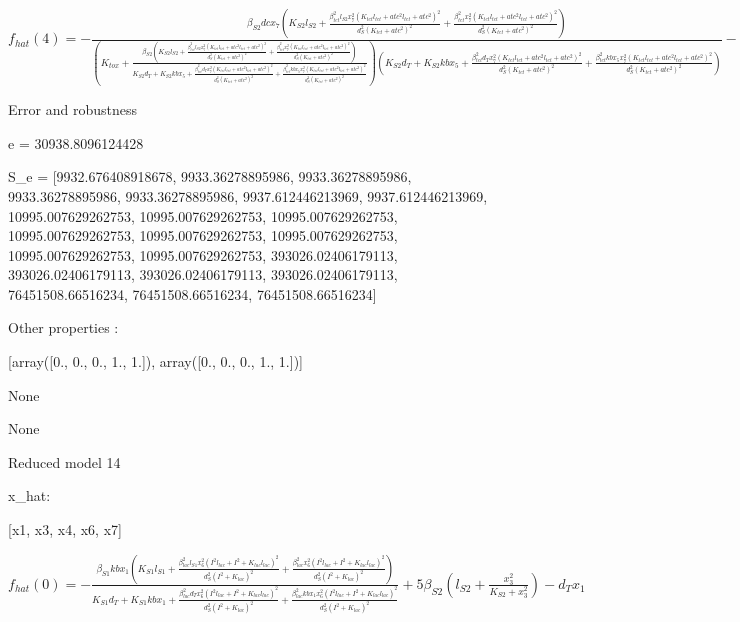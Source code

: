 $f_{hat}(4)=- \frac{\beta_{S2} dc x_{7} \left(K_{S2} l_{S2} + \frac{\beta_{tet}^{2} l_{S2} x_{7}^{2} \left(K_{tet} l_{tet} + atc^{2} l_{tet} + atc^{2}\right)^{2}}{d_{S}^{2} \left(K_{tet} + atc^{2}\right)^{2}} + \frac{\beta_{tet}^{2} x_{7}^{2} \left(K_{tet} l_{tet} + atc^{2} l_{tet} + atc^{2}\right)^{2}}{d_{S}^{2} \left(K_{tet} + atc^{2}\right)^{2}}\right)}{\left(K_{tox} + \frac{\beta_{S2} \left(K_{S2} l_{S2} + \frac{\beta_{tet}^{2} l_{S2} x_{7}^{2} \left(K_{tet} l_{tet} + atc^{2} l_{tet} + atc^{2}\right)^{2}}{d_{S}^{2} \left(K_{tet} + atc^{2}\right)^{2}} + \frac{\beta_{tet}^{2} x_{7}^{2} \left(K_{tet} l_{tet} + atc^{2} l_{tet} + atc^{2}\right)^{2}}{d_{S}^{2} \left(K_{tet} + atc^{2}\right)^{2}}\right)}{K_{S2} d_{T} + K_{S2} kb x_{5} + \frac{\beta_{tet}^{2} d_{T} x_{7}^{2} \left(K_{tet} l_{tet} + atc^{2} l_{tet} + atc^{2}\right)^{2}}{d_{S}^{2} \left(K_{tet} + atc^{2}\right)^{2}} + \frac{\beta_{tet}^{2} kb x_{5} x_{7}^{2} \left(K_{tet} l_{tet} + atc^{2} l_{tet} + atc^{2}\right)^{2}}{d_{S}^{2} \left(K_{tet} + atc^{2}\right)^{2}}}\right) \left(K_{S2} d_{T} + K_{S2} kb x_{5} + \frac{\beta_{tet}^{2} d_{T} x_{7}^{2} \left(K_{tet} l_{tet} + atc^{2} l_{tet} + atc^{2}\right)^{2}}{d_{S}^{2} \left(K_{tet} + atc^{2}\right)^{2}} + \frac{\beta_{tet}^{2} kb x_{5} x_{7}^{2} \left(K_{tet} l_{tet} + atc^{2} l_{tet} + atc^{2}\right)^{2}}{d_{S}^{2} \left(K_{tet} + atc^{2}\right)^{2}}\right)} - d x_{7} + kc x_{7} \left(1 - \frac{x_{6} + x_{7}}{C_{max}}\right)$



Error and robustness 


e = 30938.8096124428

S_e = [9932.676408918678, 9933.36278895986, 9933.36278895986, 9933.36278895986, 9933.36278895986, 9937.612446213969, 9937.612446213969, 10995.007629262753, 10995.007629262753, 10995.007629262753, 10995.007629262753, 10995.007629262753, 10995.007629262753, 10995.007629262753, 10995.007629262753, 393026.02406179113, 393026.02406179113, 393026.02406179113, 393026.02406179113, 76451508.66516234, 76451508.66516234, 76451508.66516234]

Other properties :


[array([0., 0., 0., 1., 1.]), array([0., 0., 0., 1., 1.])]

None

None

Reduced model 14

x_{hat}: 

[x1, x3, x4, x6, x7]


$f_{hat}(0)=- \frac{\beta_{S1} kb x_{1} \left(K_{S1} l_{S1} + \frac{\beta_{lac}^{2} l_{S1} x_{6}^{2} \left(I^{2} l_{lac} + I^{2} + K_{lac} l_{lac}\right)^{2}}{d_{S}^{2} \left(I^{2} + K_{lac}\right)^{2}} + \frac{\beta_{lac}^{2} x_{6}^{2} \left(I^{2} l_{lac} + I^{2} + K_{lac} l_{lac}\right)^{2}}{d_{S}^{2} \left(I^{2} + K_{lac}\right)^{2}}\right)}{K_{S1} d_{T} + K_{S1} kb x_{1} + \frac{\beta_{lac}^{2} d_{T} x_{6}^{2} \left(I^{2} l_{lac} + I^{2} + K_{lac} l_{lac}\right)^{2}}{d_{S}^{2} \left(I^{2} + K_{lac}\right)^{2}} + \frac{\beta_{lac}^{2} kb x_{1} x_{6}^{2} \left(I^{2} l_{lac} + I^{2} + K_{lac} l_{lac}\right)^{2}}{d_{S}^{2} \left(I^{2} + K_{lac}\right)^{2}}} + 5 \beta_{S2} \left(l_{S2} + \frac{x_{3}^{2}}{K_{S2} + x_{3}^{2}}\right) - d_{T} x_{1}$


